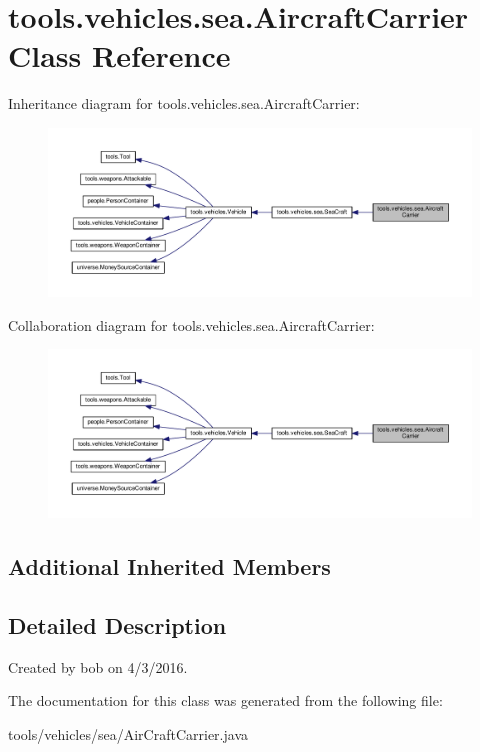 \hypertarget{classtools_1_1vehicles_1_1sea_1_1_aircraft_carrier}{}\section{tools.\+vehicles.\+sea.\+Aircraft\+Carrier Class Reference}
\label{classtools_1_1vehicles_1_1sea_1_1_aircraft_carrier}


Inheritance diagram for tools.\+vehicles.\+sea.\+Aircraft\+Carrier\+:\nopagebreak
\begin{figure}[H]
\begin{center}
\leavevmode
\includegraphics[width=350pt]{classtools_1_1vehicles_1_1sea_1_1_aircraft_carrier__inherit__graph}
\end{center}
\end{figure}


Collaboration diagram for tools.\+vehicles.\+sea.\+Aircraft\+Carrier\+:\nopagebreak
\begin{figure}[H]
\begin{center}
\leavevmode
\includegraphics[width=350pt]{classtools_1_1vehicles_1_1sea_1_1_aircraft_carrier__coll__graph}
\end{center}
\end{figure}
\subsection*{Additional Inherited Members}


\subsection{Detailed Description}
Created by bob on 4/3/2016. 

The documentation for this class was generated from the following file\+:\begin{DoxyCompactItemize}
\item 
tools/vehicles/sea/Air\+Craft\+Carrier.\+java\end{DoxyCompactItemize}
